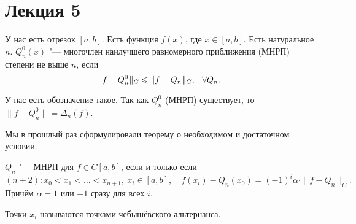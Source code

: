 
\section{Лекция 5}
У нас есть отрезок $[a,b]$. Есть функция $f(x)$, где $x\in[a,b]$. Есть натуральное $n$. $Q_n^0(x)$ "--- многочлен наилучшего равномерного приближения (МНРП) степени не выше $n$, если
\[
  \|f - Q_n^0\|_C\le \|f - Q_n\|_C,\pau \forall Q_n.
\]

У нас есть обозначение такое. Так как $Q_n^0$ (МНРП) существует, то $\|f - Q_n^0\| = \Delta_n(f)$.

Мы в прошлый раз сформулировали теорему о необходимом и достаточном условии. 

\begin{The}[Чебышёв]
  $Q_n$ "--- МНРП для $f\in C[a,b]$, если и только если
  \[
    (n+2)\colon x_0<x_1<\dots<x_{n+1},\ x_i\in[a,b],\quad
    f(x_i) - Q_n(x_0) = (-1)^i\alpha\cdot \|f - Q_n\|_C.
  \]
  Причём $\alpha=1$ или $-1$ сразу для всех $i$.
\end{The}
Точки $x_i$ называются точками чебышёвского альтернанса.
